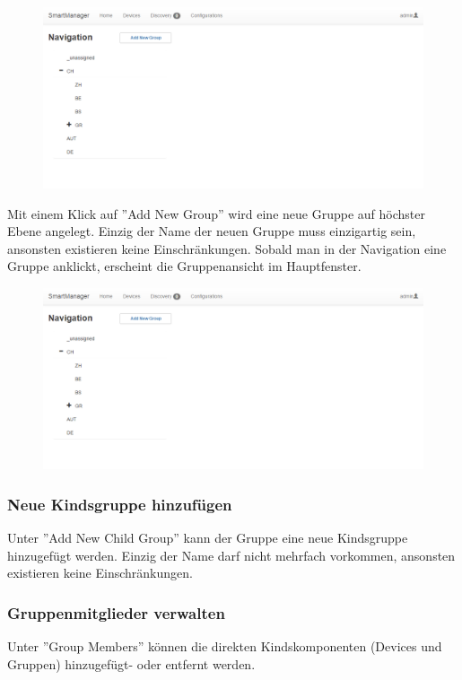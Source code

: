 \begin{figure}[H]
\includegraphics[scale=0.57]{../05_Schlussbericht/images/benutzeranleitung/gruppen_navigation.png}
\end{figure}

Mit einem Klick auf ''Add New Group'' wird eine neue Gruppe auf höchster Ebene angelegt. Einzig der Name der neuen Gruppe muss einzigartig sein, ansonsten existieren keine Einschränkungen. Sobald man in der Navigation eine Gruppe anklickt, erscheint die Gruppenansicht im Hauptfenster.

\begin{figure}[H]
\includegraphics[scale=0.57]{../05_Schlussbericht/images/benutzeranleitung/gruppen_navigation.png}
\end{figure}

\subsubsection{Neue Kindsgruppe hinzufügen}
Unter ''Add New Child Group'' kann der Gruppe eine neue Kindsgruppe hinzugefügt werden. Einzig der Name darf nicht mehrfach vorkommen, ansonsten existieren keine Einschränkungen.

\subsubsection{Gruppenmitglieder verwalten}
Unter ''Group Members'' können die direkten Kindskomponenten (Devices und Gruppen) hinzugefügt- oder entfernt werden.

